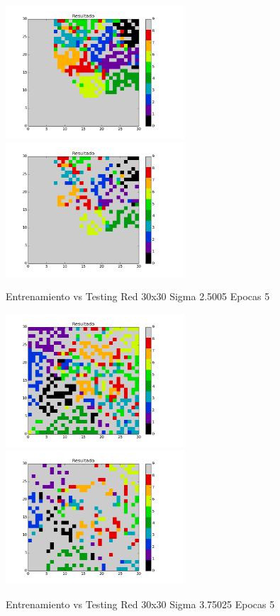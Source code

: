 \includegraphics[width=0.5\textwidth]{img/EJ2_Sigma/train_M_30_sigma_2_5005_epocas_5}
\includegraphics[width=0.5\textwidth]{img/EJ2_Sigma/test_M_30_sigma_2_5005_epocas_5}
{\center \footnotesize Entrenamiento vs Testing Red 30x30 Sigma 2.5005 Epocas 5\par}

\includegraphics[width=0.5\textwidth]{img/EJ2_Sigma/train_M_30_sigma_3_75025_epocas_5}
\includegraphics[width=0.5\textwidth]{img/EJ2_Sigma/test_M_30_sigma_3_75025_epocas_5}
{\center \footnotesize Entrenamiento vs Testing Red 30x30 Sigma 3.75025 Epocas 5\par}

